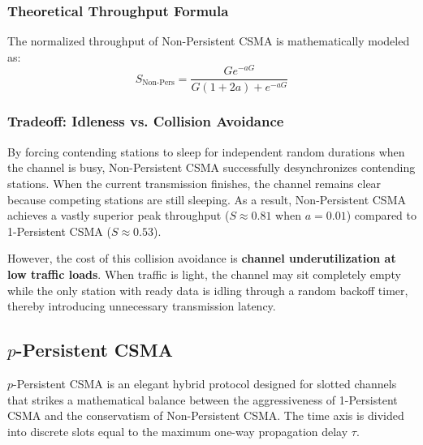 \documentclass[12pt, a4paper]{article}
\begin{document}
\subsubsection{Theoretical Throughput Formula}
The normalized throughput of Non-Persistent CSMA is mathematically modeled as:
\begin{equation}
    S_{\text{Non-Pers}} = \frac{G e^{-a G}}{G (1 + 2a) + e^{-a G}}
\end{equation}

\subsubsection{Tradeoff: Idleness vs. Collision Avoidance}
By forcing contending stations to sleep for independent random durations when the channel is busy, Non-Persistent CSMA successfully desynchronizes contending stations. When the current transmission finishes, the channel remains clear because competing stations are still sleeping. As a result, Non-Persistent CSMA achieves a vastly superior peak throughput ($S \approx 0.81$ when $a = 0.01$) compared to 1-Persistent CSMA ($S \approx 0.53$).

However, the cost of this collision avoidance is \textbf{channel underutilization at low traffic loads}. When traffic is light, the channel may sit completely empty while the only station with ready data is idling through a random backoff timer, thereby introducing unnecessary transmission latency.

\subsection{$p$-Persistent CSMA}
$p$-Persistent CSMA is an elegant hybrid protocol designed for slotted channels that strikes a mathematical balance between the aggressiveness of 1-Persistent CSMA and the conservatism of Non-Persistent CSMA. The time axis is divided into discrete slots equal to the maximum one-way propagation delay $\tau$.
\end{document}
